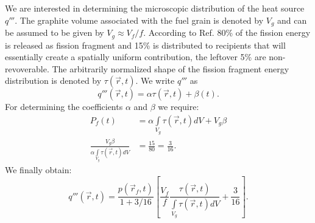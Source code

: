 \documentclass{anstrans}
\begin{document}


We are interested in determining the microscopic distribution of the heat source $q'''$. The graphite volume associated with the fuel grain is denoted by $V_g$ and can be assumed to be given by $V_g \approx V_f /f$. According to Ref. \cite{DH} 80\% of the fission energy is released as fission fragment and 15\% is distributed to recipients that will essentially create a spatially uniform contribution, the leftover 5\% are non-revoverable. The arbitrarily normalized shape of the fission fragment energy distribution is denoted by $\tau(\vec{r}, t)$. We write $q'''$ as 
\begin{equation}
  q'''(\vec{r},t) = \alpha \tau(\vec{r}, t) + \beta(t).
\end{equation}
For determining the coefficients $\alpha$ and $\beta$ we require:
\begin{align}
  P_f(t) &= \alpha \int\limits_{V_g} \tau(\vec{r}, t) dV + V_g \beta \nonumber \\ 
  \frac{V_g \beta}{\alpha \int\limits_{V_g} \tau(\vec{r}, t) dV} &= \frac{15}{80} = \frac{3}{16}.
\end{align}
We finally obtain:
\begin{equation}
   q'''(\vec{r},t) = \frac{p(\vec{r}_f,t)}{1 + 3/16} \left [  \frac{V_f}{f} \frac{\tau(\vec{r}, t)}{ \int\limits_{V_g} \tau(\vec{r}, t) dV} + \frac{3}{16} \right].
\end{equation}
\end{document}
